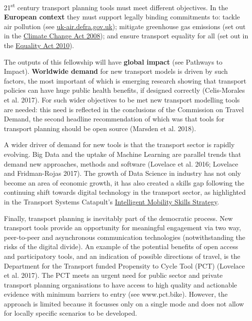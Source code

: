 \documentclass[11pt]{article}
\begin{document}
21\textsuperscript{st} century transport planning tools must meet
different objectives. In the \textbf{European context} they must support
legally binding commitments to: tackle air pollution (see
\href{https://uk-air.defra.gov.uk/air-pollution/uk-eu-policy-context}{uk-air.defra.gov.uk});
mitigate greenhouse gas emissions (set out in the
\href{http://www.legislation.gov.uk/ukpga/2008/27/contents}{Climate
Change Act 2008}); and ensure transport equality for all (set out in the
\href{https://www.gov.uk/guidance/equality-act-2010-guidance}{Equality
Act 2010}).

The outputs of this fellowship will have \textbf{global impact} (see
Pathways to Impact). \textbf{Worldwide demand} for new transport models
is driven by such factors, the most important of which is emerging
research showing that transport policies can have huge public health
benefits, if designed correctly (Celis-Morales et al. 2017). For such
wider objectives to be met new transport modelling tools are needed:
this need is reflected in the conclusions of the Commission on Travel
Demand, the second headline recommendation of which was that tools for
transport planning should be open source (Marsden et al. 2018).

A wider driver of demand for new tools is that the transport sector is
rapidly evolving. Big Data and the uptake of Machine Learning are
parallel trends that demand new approaches, methods and software
(Lovelace et al. 2016; Lovelace and Fridman-Rojas 2017). The growth of
Data Science in industry has not only become an area of economic growth,
it has also created a skills gap following the continuing shift towards
digital technology in the transport sector, as highlighted in the
Transport Systems Catapult's
\href{http://ts.catapult.org.uk/imskills/}{Intelligent Mobility Skills
Strategy}.

Finally, transport planning is inevitably part of the democratic
process. New transport tools provide an opportunity for meaningful
engagement via two way, peer-to-peer and asynchronous communication
technologies (notwithstanding the risks of the digital divide). An
example of the potential benefits of open access and participatory
tools, and an indication of possible directions of travel, is the
Department for the Transport funded Propensity to Cycle Tool (PCT)
(Lovelace et al. 2017). The PCT meets an urgent need for public sector
and private transport planning organisations to have access to high
quality and actionable evidence with minimum barriers to entry (see
www.pct.bike). However, the approach is limited because it focusses only
on a single mode and does not allow for locally specific scenarios to be
developed.
\end{document}
